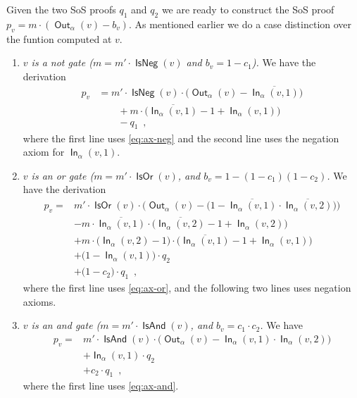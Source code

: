 \documentclass[10pt,a4paper]{article}
\theoremstyle{plain}
\theoremstyle{remark}
\theoremstyle{definition}
\newcommand{\eqcomma}{\enspace ,}
\newcommand{\vars}[1]{\mathsf{#1}}
\DeclareMathOperator{\outwire}{\vars{Out}}
\DeclareMathOperator{\inwire}{\vars{In}}
\DeclareMathOperator{\isneg}{\vars{IsNeg}}
\DeclareMathOperator{\isand}{\vars{IsAnd}}
\DeclareMathOperator{\isor}{\vars{IsOr}}
\begin{document}
Given the two SoS proofs $q_1$ and $q_2$ we are ready to construct the
SoS proof $p_v = m \cdot (\outwire_\alpha(v) - b_v)$. As mentioned earlier
we do a case distinction over the funtion computed at $v$.
\begin{enumerate}
\item \emph{$v$ is a \emph{not} gate ($m = m' \cdot \isneg(v)$ and $b_v = 1-c_1$).} We have the derivation
  \begin{align}
    \nonumber
    p_v &=  m' \cdot \isneg(v) \cdot
             \big(\outwire_{\alpha}(v) - \overline{\inwire_{\alpha}(v, 1)}\big) \\\nonumber
           &\qquad + m \cdot
             \big(\overline{\inwire_{\alpha}(v, 1)} - 1 + \inwire_{\alpha}(v, 1)\big)\\
           &\qquad - q_1\eqcomma
  \end{align}
  where the first line uses \cref{eq:ax-neg} and the
  second line uses the negation axiom for $\inwire_{\alpha}(v, 1)$.
\item \emph{$v$ is an \emph{or} gate ($m = m' \cdot \isor(v)$, and $b_v = 1-(1-c_1)(1-c_2)$.} We have the derivation
  \begin{align}
    \nonumber
    p_v =  & m' \cdot \isor(v) \cdot 
             \Big(
             \outwire_{\alpha}(v) -
             \big(
             1 -
             \overline{\inwire_{\alpha}(v, 1)} \cdot
             \overline{\inwire_{\alpha}(v, 2)}
             \big)
             \Big)\\\nonumber
           & -
             m \cdot
             \overline{\inwire_\alpha(v, 1)} \cdot
             \big(
             \overline{\inwire_{\alpha}(v, 2)}
             - 1 + \inwire_{\alpha}(v, 2)
             \big)\\\nonumber
           & +
             m \cdot
             \big(
             \inwire_\alpha(v, 2) - 1
             \big)
             \cdot
             \big(
             \overline{\inwire_{\alpha}(v, 1)}
             - 1 + \inwire_{\alpha}(v, 1)
             \big)\\\nonumber
           & +
             \big(
             1 - \inwire_\alpha(v, 1)
             \big)
             \cdot
             q_2 \\
           & +
             \big(
             1 - c_2
             \big)
             \cdot
             q_1\eqcomma
  \end{align}
  where the first line uses \cref{eq:ax-or}, and the
  following two lines uses negation axioms.
\item \emph{$v$ is an \emph{and} gate ($m = m' \cdot \isand(v)$, and $b_v = c_1 \cdot c_2$.} We have
  \begin{align}
    \nonumber
    p_v =  & m' \cdot \isand(v) \cdot
             \big(
             \outwire_{\alpha}(v) -
             \inwire_{\alpha}(v, 1) \cdot
             \inwire_{\alpha}(v, 2)
             \big)\\\nonumber
           & +
             \inwire_\alpha(v, 1)
             \cdot
             q_2 \\
           & +
             c_2
             \cdot
             q_1\eqcomma
  \end{align}
  where the first line uses \cref{eq:ax-and}.
\end{enumerate}
\end{document}
